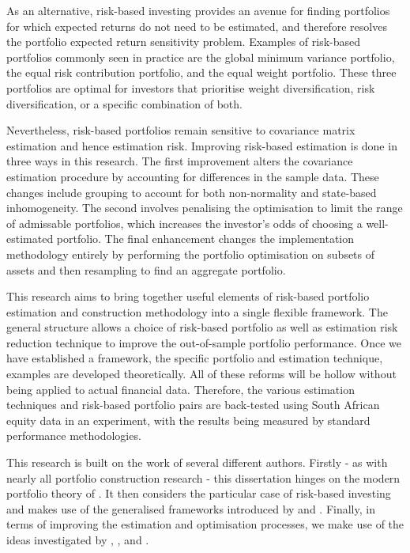 \documentclass[
]{article}
\begin{document}
As an alternative, risk-based investing provides an avenue for finding portfolios for which expected
returns do not need to be estimated, and therefore resolves the portfolio expected return
sensitivity problem. Examples of risk-based portfolios commonly seen in practice are the global
minimum variance portfolio, the equal risk contribution portfolio, and the equal weight portfolio.
These three portfolios are optimal for investors that prioritise weight diversification, risk
diversification, or a specific combination of both.

Nevertheless, risk-based portfolios remain sensitive to covariance matrix estimation and hence
estimation risk. Improving risk-based estimation is done in three ways in this research. The first
improvement alters the covariance estimation procedure by accounting for differences in the sample
data. These changes include grouping to account for both non-normality and state-based
inhomogeneity. The second involves penalising the optimisation to limit the range of admissable
portfolios, which increases the investor's odds of choosing a well-estimated portfolio. The final
enhancement changes the implementation methodology entirely by performing the portfolio optimisation
on subsets of assets and then resampling to find an aggregate portfolio.

This research aims to bring together useful elements of risk-based portfolio estimation and
construction methodology into a single flexible framework. The general structure allows a choice of
risk-based portfolio as well as estimation risk reduction technique to improve the out-of-sample
portfolio performance. Once we have established a framework, the specific portfolio and estimation
technique, examples are developed theoretically. All of these reforms will be hollow without being
applied to actual financial data. Therefore, the various estimation techniques and risk-based
portfolio pairs are back-tested using South African equity data in an experiment, with the results
being measured by standard performance methodologies.

This research is built on the work of several different authors. Firstly - as with nearly all
portfolio construction research - this dissertation hinges on the modern portfolio theory of \citet{M52}.
It then considers the particular case of risk-based investing and makes use of the generalised
frameworks introduced by \citet{J13} and \citet{RR15}. Finally, in terms of improving the estimation and
optimisation processes, we make use of the ideas investigated by \citet{FD18}, \citet{K18}, and \citet{SW17}.
\end{document}
